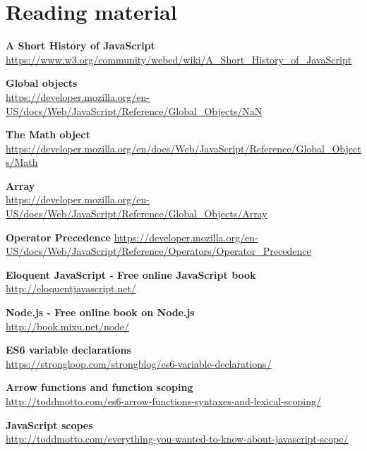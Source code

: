 \section{Reading material}\label{sec:reading_material}
\textbf{A Short History of JavaScript}\\
\url{https://www.w3.org/community/webed/wiki/A_Short_History_of_JavaScript}

\textbf{Global objects}\\
\url{https://developer.mozilla.org/en-US/docs/Web/JavaScript/Reference/Global_Objects/NaN}

\textbf{The Math object}\\
\url{https://developer.mozilla.org/en/docs/Web/JavaScript/Reference/Global_Objects/Math}

\textbf{Array}\\
\url{https://developer.mozilla.org/en-US/docs/Web/JavaScript/Reference/Global_Objects/Array}

\textbf{Operator Precedence}
\url{https://developer.mozilla.org/en-US/docs/Web/JavaScript/Reference/Operators/Operator_Precedence}

\textbf{Eloquent JavaScript - Free online JavaScript book}\\
\url{http://eloquentjavascript.net/}

\textbf{Node.js - Free online book on Node.js}\\
\url{http://book.mixu.net/node/}

\textbf{ES6 variable declarations}\\
\url{https://strongloop.com/strongblog/es6-variable-declarations/}

\textbf{Arrow functions and function scoping}\\
\url{http://toddmotto.com/es6-arrow-functions-syntaxes-and-lexical-scoping/}

\textbf{JavaScript scopes}\\
\url{http://toddmotto.com/everything-you-wanted-to-know-about-javascript-scope/}

